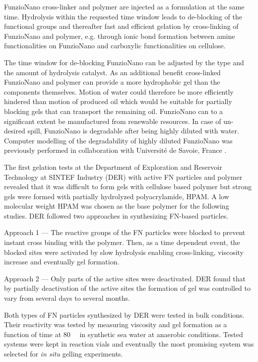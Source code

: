 \documentclass[journal = enfuem, manuscript =  article]{achemso}
\begin{document}
FunzioNano cross-linker and polymer are injected as a formulation at the same time. Hydrolysis within the requested time window leads to de-blocking of the functional groups and thereafter fast and efficient gelation by cross-linking of FunzioNano and polymer, e.g. through ionic bond formation between amine functionalities on FunzioNano and carboxylic functionalities on cellulose.

The time window for de-blocking FunzioNano can be adjusted by the type and the amount of hydrolysis catalyst. As an additional benefit cross-linked FunzioNano and polymer can provide a more hydrophobic gel than the components themselves. Motion of water could therefore be more efficiently hindered than motion of produced oil which would be suitable for partially blocking gels that can transport the remaining oil. FunzioNano can to a significant extent be manufactured from renewable resources. In case of un-desired spill, FunzioNano is degradable after being highly diluted with water. Computer modelling of the degradability of highly diluted FunzioNano was previously performed in collaboration with Université de Savoie, France \citep{Neyertz2012,Neyertz2013}.

The first gelation tests at the Department of Exploration and Reservoir Technology at SINTEF Industry (DER) with active FN particles and polymer revealed that it was difficult to form gels with cellulose based polymer but strong gels were formed with partially hydrolyzed polyacrylamide, HPAM. A low molecular weight HPAM was chosen as the base polymer for the following studies. DER followed two approaches in synthesizing FN-based particles. 
    
    Approach 1 --- The reactive groups of the FN particles were blocked to prevent instant cross binding with the polymer. Then, as a time dependent event, the blocked sites were activated by slow hydrolysis enabling cross-linking, viscosity increase and eventually gel formation.
    
    Approach 2 --- Only parts of the active sites were deactivated. DER found that by partially deactivation of the active sites the formation of gel was controlled to vary from several days to several months.
    
Both types of FN particles synthesized by DER were tested in bulk conditions. Their reactivity was tested by measuring viscosity and gel formation as a function of time at 80~\celsius~ in synthetic sea water at anaerobic conditions. Tested systems were kept in reaction vials and eventually the most promising system  was selected for \emph{in situ} gelling experiments.
    
\end{document}
